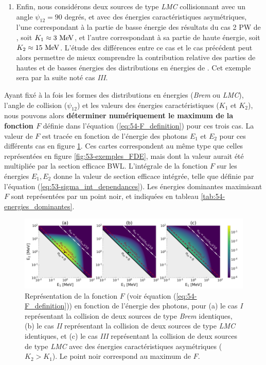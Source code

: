 \begin{refsection}
\begin{enumerate}[label={\Roman*. }]
    \item Enfin, nous considérons deux sources de type \textit{LMC} collisionnant avec un angle $\psi_{12}=90$ degrés, et avec des énergies caractéristiques asymétriques, l'une correspondant à la partie de basse énergie des résultats du cas 2 PW de \cite{wang_2020}, soit $K_1 \approx 3 ~ \rm MeV$, et l'autre correspondant à sa partie de haute énergie, soit $K_2 \approx 15 ~ \rm MeV$. L'étude des différences entre ce cas et le cas précédent peut alors permettre de mieux comprendre la contribution relative des parties de hautes et de basses énergies des distributions en énergies de \cite{wang_2020}. Cet exemple sera par la suite noté cas \textit{III}.
\end{enumerate}

Ayant fixé à la fois les formes des distributions en énergies (\textit{Brem} ou \textit{LMC}), l'angle de collision ($\psi_{12}$) et les valeurs des énergies caractéristiques ($K_1$ et $K_2$), nous pouvons alors \textbf{déterminer numériquement le maximum de la fonction $F$} définie dans l'équation (\ref{eq:54-F_definition}) pour ces trois cas. La valeur de $F$ est tracée en fonction de l'énergie des photons $E_1$ et $E_2$ pour ces différents cas en figure \ref{fig:54-cartes_F}. Ces cartes correspondent au même type que celles représentées en figure \ref{fig:53-exemples_FDE}, mais dont la valeur aurait été multipliée par la section efficace BWL. L'intégrale de la fonction $F$ sur les énergies $E_1,E_2$ donne la valeur de section efficace intégrée, telle que définie par l'équation (\ref{eq:53-sigma_int_dependances}). Les énergies dominantes maximisant $F$ sont représentées par un point noir, et indiquées en tableau \ref{tab:54-energies_dominantes}. 

\begin{figure}[hbtp]
	\centering
	\includegraphics[width=\linewidth]{5-opti_theorique/cinematique_validation.png}
	\caption{Représentation de la fonction $F$ (voir équation (\ref{eq:54-F_definition})) en fonction de l'énergie des photons, pour (a) le cas \textit{I} représentant la collision de deux sources de type \textit{Brem} identiques, (b) le cas \textit{II} représentant la collision de deux sources de type \textit{LMC} identiques, et (c) le cas \textit{III} représentant la collision de deux sources de type \textit{LMC} avec des énergies caractéristiques asymétriques ($K_2>K_1$). Le point noir correspond au maximum de $F$.}
	\label{fig:54-cartes_F}
\end{figure}


\end{refsection}
